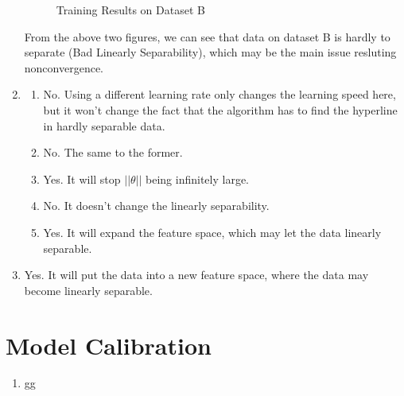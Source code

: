 \documentclass[12pt]{article}
\begin{document}
\begin{enumerate}[label=(\alph*)]
\begin{figure}[H]
        \caption{Training Results on Dataset B}
    \end{figure}
    From the above two figures, we can see that data on dataset B is hardly to separate (Bad Linearly Separability), which may be the main issue resluting nonconvergence.
    \item 
    \begin{enumerate}[label=\roman*]
        \item No. Using a different learning rate only changes the learning speed here, but it won't change the fact that the algorithm has to find the hyperline in hardly separable data.
        \item No. The same to the former.
        \item Yes. It will stop $||\theta||$ being infinitely large.
        \item No. It doesn't change the linearly separability.
        \item Yes. It will expand the feature space, which may let the data linearly separable.
    \end{enumerate}
    \item Yes. It will put the data into a new feature space, where the data may become linearly separable.
    \end{enumerate}

    \newpage
    \section*{Model Calibration}
    \begin{enumerate}[label=(\alph*)]
    \item gg
    \end{enumerate}
\end{document}
